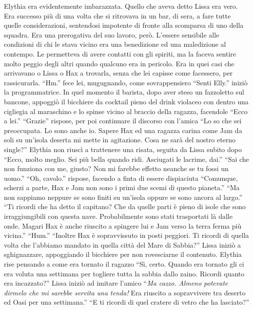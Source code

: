     Elythia era evidentemente imbarazzata. Quello che aveva detto Lissa era
    vero. Era successo più di una volta che si ritrovava in un bar, di
    sera, a fare tutte quelle considerazioni, sentendosi impotente di
    fronte alla scomparsa di uno della squadra. Era una prerogativa del suo
    lavoro, però. L'essere sensibile alle condizioni di chi le stava vicino
    era una benedizione ed una maledizione al contempo. Le permetteva di
    avere contatti con gli spiriti, ma la faceva sentire molto peggio degli
    altri quando qualcuno era in pericolo. Era in quei casi che arrivavano
    o Lissa o Hax a trovarla, senza che lei capisse come facessero, per
    rassicurarla. ``Hm.'' fece lei, mugugnando, come sovrappensiero
    ``Senti Elly.'' iniziò la programmatrice. In quel momento il barista,
    dopo aver steso un fazzoletto sul bancone, appoggiò il bicchiere da
    cocktail pieno del drink violaceo con dentro una cigliegia al
    maraschino e lo spinse vicino al braccio della ragazza, facendole
    ``Ecco a lei.'' ``Grazie'' rispose, per poi continuare il discorso con
    l'amica ``Lo so che sei preoccupata. Lo sono anche io. Sapere Hax ed
    una ragazza carina come Jam da soli su un'isola deserta mi mette in
    agitazione. Cosa ne sarà del nostro eterno single?'' Elythia non riuscì
    a trattenere una risata, seguita da Lissa subito dopo ``Ecco, molto
    meglio. Sei più bella quando ridi. Asciugati le lacrime, dai.'' ``Sai che non funziona con me,
    giusto? Non mi farebbe effetto neanche se tu fossi un uomo.'' ``Oh,
    cavolo.'' rispose, facendo a finta di essere dispiaciuta ``Comunque,
    scherzi a parte, Hax e Jam non sono i primi due scemi di questo
    pianeta.'' ``Ma non sappiamo neppure se sono finiti su un'isola oppure
    se sono ancora al largo.'' ``Ti ricordi che ha detto il capitano? Che da
    quelle parti è pieno di isole che sono irraggiungibili con questa nave.
    Probabilmente sono stati trasportati là dalle onde. Magari Hax è anche
    riuscito a spingere lui e Jam verso la terra ferma più vicina.''
    ``Hum.'' ``Inoltre Hax è sopravvissuto in posti peggiori. Ti ricordi di
    quella volta che l'abbiamo mandato in quella città del Mare di Sabbia?''
    Lissa iniziò a sghignazzare, appoggiando il bicchiere per non
    rovesciarne il contenuto. Elythia rise pensando a come era tornato il
    ragazzo ``Sì, certo. Quando era tornato gli ci era voluta una settimana
    per togliere tutta la sabbia dallo zaino. Ricordi quanto era
    incazzato?'' Lissa iniziò ad imitare l'amico ``\emph{Ma cazzo. Almeno
    potevate dirmelo che mi sarebbe servita una tenda!} Era riuscito a
    sopravvivere tra deserto ed Oasi per una settimana.'' ``E ti ricordi di
    quel cratere di vetro che ha lasciato?''

